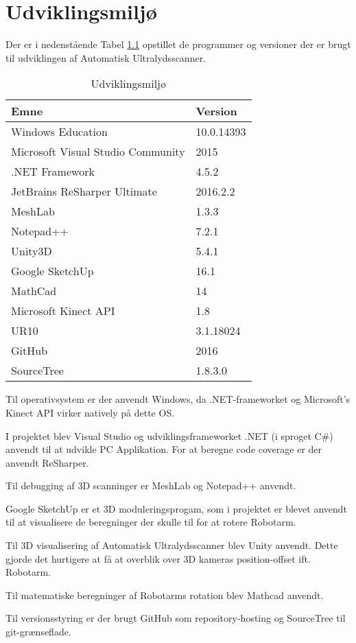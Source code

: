 \chapter{Udviklingsmiljø}\label{Udvikling}
Der er i nedenstående Tabel \ref{Udvikling} opstillet de programmer og versioner der er brugt til udviklingen af Automatisk Ultralydsscanner. 

\begin{table}[htb]
\centering
\begin{tabular}{| l | p{}| }
\hline
\textbf{Emne} & \textbf{Version} \\\hline
Windows Education & 10.0.14393 \\\hline
Microsoft Visual Studio Community & 2015 \\\hline
.NET Framework & 4.5.2 \\\hline
JetBrains ReSharper Ultimate & 2016.2.2\\\hline
MeshLab & 1.3.3 \\\hline
Notepad++ & 7.2.1 \\\hline
Unity3D & 5.4.1 \\\hline
Google SketchUp & 16.1 \\\hline
MathCad & 14 \\\hline
Microsoft Kinect API & 1.8 \\\hline
UR10 & 3.1.18024 \\\hline
GitHub & 2016\\\hline
SourceTree & 1.8.3.0 \\\hline

\end{tabular}
\caption{Udviklingsmiljø}
\label{Udvikling}
\end{table}

Til operativsystem er der anvendt Windows, da .NET-frameworket og Microsoft's Kinect API virker natively på dette OS.

I projektet blev Visual Studio og udviklingsframeworket .NET (i sproget C\#) anvendt til at udvikle PC Applikation. For at beregne code coverage er der anvendt ReSharper.

Til debugging af 3D scanninger er MeshLab og Notepad++ anvendt. 

Google SketchUp er et 3D moduleringsprogam, som i projektet er blevet anvendt til at visualisere de beregninger der skulle til for at rotere Robotarm.

Til 3D visualisering af Automatisk Ultralydsscanner blev Unity anvendt. Dette gjorde det hurtigere at få at overblik over 3D kameras position-offset ift. Robotarm.

Til matematiske beregninger af Robotarms rotation blev Mathcad anvendt.

Til versionsstyring er der brugt GitHub som repository-hosting og SourceTree til git-grænseflade.

